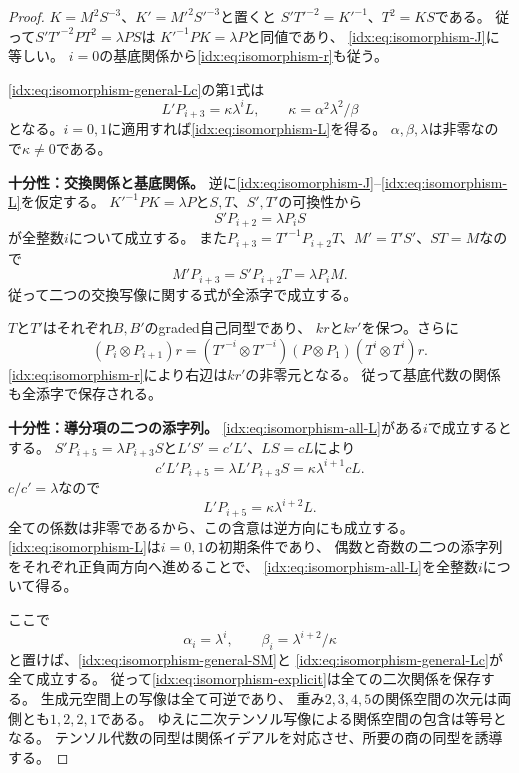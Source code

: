 \documentclass[11pt,a4paper]{ltjsarticle}
\theoremstyle{definition}
\begin{document}
\begin{proof}
$K=M^2S^{-3}$、$K'=M'^2S'^{-3}$と置くと
$S'T'^{-2}=K'^{-1}$、$T^2=KS$である。
従って$S'T'^{-2}PT^2=\lambda PS$は
$K'^{-1}PK=\lambda P$と同値であり、
\eqref{idx:eq:isomorphism-J}に等しい。
$i=0$の基底関係から\eqref{idx:eq:isomorphism-r}も従う。

\eqref{idx:eq:isomorphism-general-Lc}の第1式は
\begin{equation}\label{idx:eq:isomorphism-all-L}
L'P_{i+3}=\kappa\lambda^iL,\qquad
\kappa=\alpha^2\lambda^2/\beta
\end{equation}
となる。$i=0,1$に適用すれば\eqref{idx:eq:isomorphism-L}を得る。
$\alpha,\beta,\lambda$は非零なので$\kappa\ne0$である。

\par\smallskip\noindent\textbf{十分性：交換関係と基底関係。}\quad
逆に\eqref{idx:eq:isomorphism-J}--\eqref{idx:eq:isomorphism-L}を仮定する。
$K'^{-1}PK=\lambda P$と$S,T$、$S',T'$の可換性から
\[
S'P_{i+2}=\lambda P_iS
\]
が全整数$i$について成立する。
また$P_{i+3}=T'^{-1}P_{i+2}T$、$M'=T'S'$、$ST=M$なので
\[
M'P_{i+3}=S'P_{i+2}T=\lambda P_iM.
\]
従って二つの交換写像に関する式が全添字で成立する。

$T$と$T'$はそれぞれ$B,B'$のgraded自己同型であり、
$kr$と$kr'$を保つ。さらに
\[
(P_i\otimes P_{i+1})r
=(T'^{-i}\otimes T'^{-i})(P\otimes P_1)
(T^i\otimes T^i)r.
\]
\eqref{idx:eq:isomorphism-r}により右辺は$kr'$の非零元となる。
従って基底代数の関係も全添字で保存される。

\par\smallskip\noindent\textbf{十分性：導分項の二つの添字列。}\quad
\eqref{idx:eq:isomorphism-all-L}がある$i$で成立するとする。
$S'P_{i+5}=\lambda P_{i+3}S$と$L'S'=c'L'$、$LS=cL$により
\[
c'L'P_{i+5}
=\lambda L'P_{i+3}S
=\kappa\lambda^{i+1}cL.
\]
$c/c'=\lambda$なので
\[
L'P_{i+5}=\kappa\lambda^{i+2}L.
\]
全ての係数は非零であるから、この含意は逆方向にも成立する。
\eqref{idx:eq:isomorphism-L}は$i=0,1$の初期条件であり、
偶数と奇数の二つの添字列をそれぞれ正負両方向へ進めることで、
\eqref{idx:eq:isomorphism-all-L}を全整数$i$について得る。

ここで
\[
\alpha_i=\lambda^i,\qquad
\beta_i=\lambda^{i+2}/\kappa
\]
と置けば、\eqref{idx:eq:isomorphism-general-SM}と
\eqref{idx:eq:isomorphism-general-Lc}が全て成立する。
従って\eqref{idx:eq:isomorphism-explicit}は全ての二次関係を保存する。
生成元空間上の写像は全て可逆であり、
重み$2,3,4,5$の関係空間の次元は両側とも$1,2,2,1$である。
ゆえに二次テンソル写像による関係空間の包含は等号となる。
テンソル代数の同型は関係イデアルを対応させ、所要の商の同型を誘導する。
\end{proof}
\end{document}
